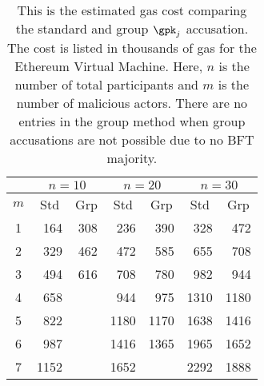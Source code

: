 \begin{table}
\centering
\begin{tabular}{|c||r|r||r|r||r|r|}
\hline
  & \multicolumn{2}{|c||}{$n = 10$} & \multicolumn{2}{|c||}{$n = 20$} &
    \multicolumn{2}{|c|}{$n = 30$} \\
\hline
    $m$ & \multicolumn{1}{|c|}{Std} & \multicolumn{1}{|c||}{Grp} &
          \multicolumn{1}{|c|}{Std} & \multicolumn{1}{|c||}{Grp} &
          \multicolumn{1}{|c|}{Std} & \multicolumn{1}{|c||}{Grp} \\
\hline
    1 &  164 &  308 &  236 &  390 &  328 &  472 \\
    2 &  329 &  462 &  472 &  585 &  655 &  708 \\
    3 &  494 &  616 &  708 &  780 &  982 &  944 \\
    4 &  658 &      &  944 &  975 & 1310 & 1180 \\
    5 &  822 &      & 1180 & 1170 & 1638 & 1416 \\
    6 &  987 &      & 1416 & 1365 & 1965 & 1652 \\
    7 & 1152 &      & 1652 &      & 2292 & 1888 \\
\hline
\end{tabular}
\caption[Malicious $\gpk_{j}$ Accusation Gas Cost]{
This is the estimated gas cost comparing the standard and group
$\gpk_{j}$ accusation. The cost is listed in thousands of gas
for the Ethereum Virtual Machine.
Here, $n$ is the number of total participants and $m$ is the number
of malicious actors.
There are no entries in the group method when group accusations
are not possible due to no BFT majority.
}
\label{tab:gpkj_gas_cost}
\end{table}
